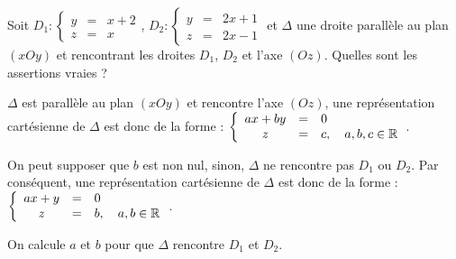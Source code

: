 \begin{question} 

Soit  $D_1 : \left\{\begin{array}{ccl}y&=&x+2\\z&=&x \end{array}\right.$,   
$D_2 : \left\{\begin{array}{ccl}y&=&2x+1\\z&=&2x-1 \end{array}\right.$ et $\Delta$ une droite parallèle au plan $(xOy)$ et rencontrant les droites $D_1$, $D_2$ et l'axe $(Oz)$. 
Quelles sont les assertions vraies ?
\begin{answers}

 
    
   
   
\end{answers}
\begin{explanations}
$\Delta$ est parallèle au plan $(xOy)$ et rencontre l'axe  $(Oz)$, une représentation cartésienne de $\Delta$ est donc  de la forme : 
$ \left\{\begin{array}{ccl}ax+by&=&0\\z&=&c, \quad a,b,c \in \mathbb{R} \end{array}\right.$. 

 On peut supposer que $b$ est non nul, sinon, $\Delta$ ne rencontre pas $D_1$ ou $D_2$. Par conséquent, une représentation cartésienne de $\Delta$ est donc  de la forme : 
$ \left\{\begin{array}{ccl}ax+y&=&0\\z&=&b, \quad a,b \in \mathbb{R} \end{array}\right.$.

 On calcule $a$ et $b$ pour que $\Delta$ rencontre $D_1$ et $D_2$.
\end{explanations}

\end{question}


